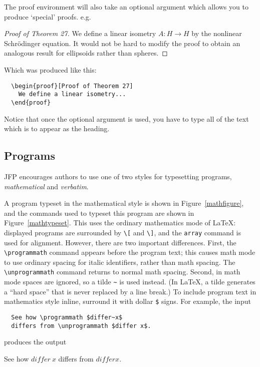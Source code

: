 \documentclass{jfp}
\begin{document}
The proof environment will also take an optional argument which allows you
to produce `special' proofs. e.g.
%
\begin{proof}[Proof of Theorem 27]
  We define a linear isometry $A:H\rightarrow H$ by the nonlinear
  Schr\"{o}dinger equation. It would not be hard to modify the
  proof to obtain an analogous result for ellipsoids rather than
  spheres.
\end{proof}
%
Which was produced like this:
%
\begin{verbatim}
  \begin{proof}[Proof of Theorem 27]
    We define a linear isometry...
  \end{proof}
\end{verbatim}
%
Notice that once the optional argument is used, you have to type all of
the text which is to appear as the heading.

\subsection{Programs}\label{sec-programs}

JFP encourages authors to use one of two styles for typesetting programs,
\emph{mathematical} and \emph{verbatim}.

A program typeset in the mathematical style is shown in
Figure~\ref{mathfigure}, and the commands used to typeset this program
are shown in Figure~\ref{mathtypeset}.  This uses the ordinary
mathematics mode of \LaTeX: displayed programs are surrounded by
\verb|\[| and \verb|\]|, and the \verb|array| command is used for
alignment.  However, there are two important differences.  First, the
\verb|\programmath| command appears before the program text; this
causes math mode to use ordinary spacing for italic identifiers,
rather than math spacing.  The \verb|\unprogrammath| command returns
to normal math spacing.  Second, in math mode spaces are ignored, so a
tilde \verb|~| is used instead.  (In \LaTeX, a tilde generates a
``hard space'' that is never replaced by a line break.)  To include
program text in mathematics style inline, surround it with dollar
\verb|$| signs.  For example, the input
\begin{verbatim}
  See how \programmath $differ~x$
  differs from \unprogrammath $differ x$.
\end{verbatim}
produces the output
\begin{center}
  See how \programmath $differ~x$
  differs from \unprogrammath $differ x$.
\end{center}
\end{document}

